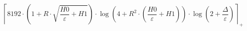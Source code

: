 \[\left\lceil 8192 \cdot \left(1 + R \cdot \sqrt{\frac{H0}{\varepsilon} + H1}\right) \cdot \log\left(4 + R^{2} \cdot \left(\frac{H0}{\varepsilon} + H1\right)\right) \cdot \log\left(2 + \frac{\Delta}{\varepsilon}\right) \right\rceil_{+}\]
